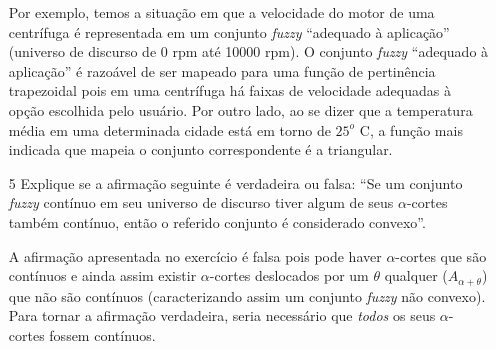 \documentclass{report}
\begin{document}
\begin{enumerate}
Por exemplo, temos a situação em que a velocidade do motor de uma centrífuga é representada
em um conjunto \emph{fuzzy} ``adequado à aplicação'' (universo de discurso de 0 rpm até 10000 rpm). 
O conjunto \emph{fuzzy} ``adequado à aplicação'' é razoável 
de ser mapeado
para uma função de pertinência trapezoidal pois em uma centrífuga há faixas de velocidade adequadas à opção escolhida pelo usuário.
Por outro lado, ao se dizer que a temperatura média em uma determinada cidade está em torno de $25^o$ C, 
a função mais indicada que mapeia o conjunto correspondente é a triangular.



\item[5] Explique se a afirmação seguinte é verdadeira ou falsa: “Se um conjunto \emph{fuzzy} contínuo em
seu universo de discurso tiver algum de seus $\alpha$-cortes também contínuo, então o referido
conjunto é considerado convexo”.

A afirmação apresentada no exercício é falsa pois pode haver $\alpha$-cortes que são contínuos e ainda assim 
existir $\alpha$-cortes deslocados por um $\theta$ qualquer ($A_{\alpha+\theta}$) que não são contínuos (caracterizando
assim um conjunto \emph{fuzzy} não convexo). Para tornar a afirmação verdadeira, seria necessário que \emph{todos} os seus $\alpha$-cortes 
fossem contínuos.


\end{enumerate}
\end{document}
